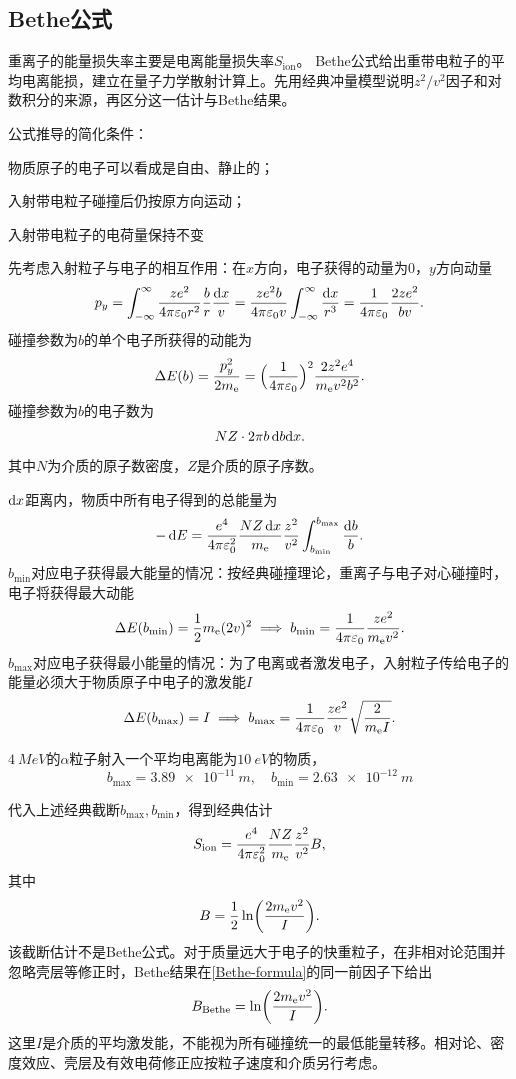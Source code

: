 \subsection{Bethe公式}

重离子的能量损失率主要是电离能量损失率$S_{\mathrm{ion}}$。
Bethe公式给出重带电粒子的平均电离能损，建立在量子力学散射计算上。先用经典冲量模型说明$z^2/v^2$因子和对数积分的来源，再区分这一估计与Bethe结果。

公式推导的简化条件：
\begin{compactenum}
	\item 物质原子的电子可以看成是自由、静止的；
	\item 入射带电粒子碰撞后仍按原方向运动；
	\item 入射带电粒子的电荷量保持不变
\end{compactenum}

先考虑入射粒子与电子的相互作用：在$x$方向，电子获得的动量为0，$y$方向动量 
\[
	p_y = \int_{-\infty}^\infty\frac{ze^2}{4\pi\varepsilon_0r^2}\frac br\frac{\mathop{}\!\mathrm{d} x}v = \frac{ze^2b}{4\pi\varepsilon_0v}\int_{-\infty}^\infty\frac{\mathop{}\!\mathrm{d} x}{r^3} = \frac1{4\pi\varepsilon_0}\frac{2ze^2}{bv}.
\]
碰撞参数为$b$的单个电子所获得的动能为
\[
	\Delta E(b) = \frac{p_y^2}{2m_{\mathrm{e}}} = \Bigl(\frac1{4\pi\varepsilon_0}\Bigr)^2\frac{2z^2e^4}{m_{\mathrm{e}} v^2b^2}.
\]
碰撞参数为$b$的电子数为
\[
	NZ \cdot 2\pi b\mathop{}\!\mathrm{d} b\mathrm{d} x.
\]
其中$N$为介质的原子数密度，$Z$是介质的原子序数。

$\mathop{}\!\mathrm{d} x$距离内，物质中所有电子得到的总能量为
\[
	-\mathop{}\!\mathrm{d} E = \frac{e^4}{4\pi\varepsilon_0^2}\frac{NZ\mathop{}\!\mathrm{d} x}{m_{\mathrm{e}}}\frac{z^2}{v^2}\int_{b_{\min}}^{b_{\max}}\frac{\mathop{}\!\mathrm{d} b}b.
\]
$b_{\min}$对应电子获得最大能量的情况：按经典碰撞理论，重离子与电子对心碰撞时，电子将获得最大动能
\[
	\Delta E(b_{\min}) = \frac12m_{\mathrm{e}}(2v)^2 \implies b_{\min} = \frac1{4\pi\varepsilon_0}\frac{ze^2}{m_{\mathrm{e}} v^2}.
\]
$b_{\max}$对应电子获得最小能量的情况：为了电离或者激发电子，入射粒子传给电子的能量必须大于物质原子中电子的激发能$I$
\[
	\Delta E(b_{\max}) = I \implies b_{\max} = \frac1{4\pi\varepsilon_0}\frac{ze^2}{v}\sqrt{\frac2{m_{\mathrm{e}} I}}.
\]
\begin{example}{}{}
	$\qty{4}{MeV}$的$\alpha$粒子射入一个平均电离能为$\qty{10}{eV}$的物质，
	\[
		b_{\max} = \qty{3.89e-11}{m},\quad b_{\min} = \qty{2.63e-12}{m}
	\]
\end{example}

代入上述经典截断$b_{\max},b_{\min}$，得到经典估计
\begin{align}\label{Bethe-formula}
	S_{\mathrm{ion}} = \frac{e^4}{4\pi\varepsilon_0^2}\frac{NZ}{m_{\mathrm{e}}}\frac{z^2}{v^2}B,
\end{align}
其中 
\[
	B = \frac12\ln\biggl(\frac{2m_{\mathrm{e}} v^2}I\biggr).
\]
该截断估计不是Bethe公式。对于质量远大于电子的快重粒子，在非相对论范围并忽略壳层等修正时，Bethe结果在\eqref{Bethe-formula}的同一前因子下给出
\begin{equation}\label{eq:nrd-bethe-stopping-logarithm}
	B_{\mathrm{Bethe}} = \ln\biggl(\frac{2m_{\mathrm{e}} v^2}I\biggr).
\end{equation}
这里$I$是介质的平均激发能，不能视为所有碰撞统一的最低能量转移。相对论、密度效应、壳层及有效电荷修正应按粒子速度和介质另行考虑。


